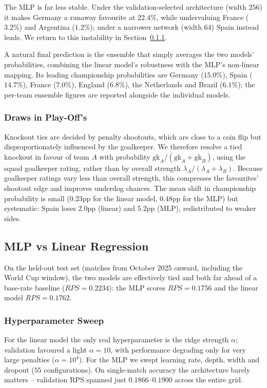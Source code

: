 \documentclass{article}
\begin{document}
The MLP is far less stable. Under the validation-selected architecture (width $256$) it makes Germany a runaway favourite at $22.4\%$, while undervaluing France ($3.2\%$) and Argentina ($1.2\%$); under a narrower network (width $64$) Spain instead leads. We return to this instability in Section~\ref{sec:sweep}.

A natural final prediction is the ensemble that simply averages the two models' probabilities, combining the linear model's robustness with the MLP's non-linear mapping. Its leading championship probabilities are Germany ($15.0\%$), Spain ($14.7\%$), France ($7.0\%$), England ($6.8\%$), the Netherlands and Brazil ($6.1\%$); the per-team ensemble figures are reported alongside the individual models.  

\subsubsection{Draws in Play-Off's}

Knockout ties are decided by penalty shootouts, which are close to a coin flip but disproportionately influenced by the goalkeeper. We therefore resolve a tied knockout in favour of team $A$ with probability $\mathrm{gk}_A/(\mathrm{gk}_A+\mathrm{gk}_B)$, using the squad goalkeeper rating, rather than by overall strength $\lambda_A/(\lambda_A+\lambda_B)$. Because goalkeeper ratings vary less than overall strength, this compresses the favourites' shootout edge and improves underdog chances. The mean shift in championship probability is small ($0.23$pp for the linear model, $0.48$pp for the MLP) but systematic: Spain loses $2.0$pp (linear) and $5.2$pp (MLP), redistributed to weaker sides.

\subsection{MLP vs Linear Regression}

On the held-out test set (matches from October 2025 onward, including the World Cup window), the two models are effectively tied and both far ahead of a base-rate baseline ($RPS = 0.2234$): the MLP scores $RPS = 0.1756$ and the linear model $RPS = 0.1762$.

\subsubsection{Hyperparameter Sweep}
\label{sec:sweep}

For the linear model the only real hyperparameter is the ridge strength $\alpha$; validation favoured a light $\alpha = 10$, with performance degrading only for very large penalties ($\alpha = 10^4$). For the MLP we swept learning rate, depth, width and dropout ($55$ configurations). On single-match accuracy the architecture barely matters -- validation RPS spanned just $0.1866$--$0.1900$ across the entire grid.
\end{document}

